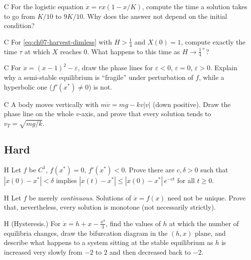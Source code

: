 \begin{problem}{C}\label{prob:ch07-c5}
For the logistic equation $\dot x = rx(1 - x/K)$, compute the time a solution
takes to go from $K/10$ to $9K/10$. Why does the answer not depend on the
initial condition?
\end{problem}

\begin{problem}{C}\label{prob:ch07-c6}
For \eqref{eq:ch07-harvest-dimless} with $H>\frac14$ and $X(0) = 1$, compute
exactly the time $\tau$ at which $X$ reaches $0$. What happens to this time as
$H\to\frac14^+$?
\end{problem}

\begin{problem}{C}\label{prob:ch07-c7}
For $\dot x = (x-1)^2 - \varepsilon$, draw the phase lines for $\varepsilon<0$,
$\varepsilon = 0$, $\varepsilon>0$. Explain why a semi-stable equilibrium is
``fragile'' under perturbation of $f$, while a hyperbolic one ($f'(x^*)\neq0$)
is not.
\end{problem}

\begin{problem}{C}\label{prob:ch07-c8}
 A body moves vertically with
$m\dot v = mg - kv|v|$ (down positive). Draw the phase line on the whole $v$-axis,
and prove that every solution tends to $v_T = \sqrt{mg/k}$.
\end{problem}

\subsection*{Hard}

\begin{problem}{H}\label{prob:ch07-h1}
Let $f$ be $C^1$, $f(x^*) = 0$, $f'(x^*)<0$. Prove there are $c,\delta>0$ such
that $|x(0) - x^*|<\delta$ implies
$|x(t) - x^*|\le|x(0) - x^*|\,e^{-ct}$ for all $t\ge0$.
\end{problem}

\begin{problem}{H}\label{prob:ch07-h2}
Let $f$ be merely \emph{continuous}. Solutions of $\dot x = f(x)$ need not be
unique. Prove that, nevertheless, every solution is monotone (not
necessarily strictly).
\end{problem}

\begin{problem}{H}\label{prob:ch07-h3}
(Hysteresis.) For $\dot x = h + x - \frac{x^3}{3}$, find the values of $h$ at
which the number of equilibria changes, draw the bifurcation diagram in the
$(h,x)$ plane, and describe what happens to a system sitting at the stable
equilibrium as $h$ is increased very slowly from $-2$ to $2$ and then decreased
back to $-2$.
\end{problem}

